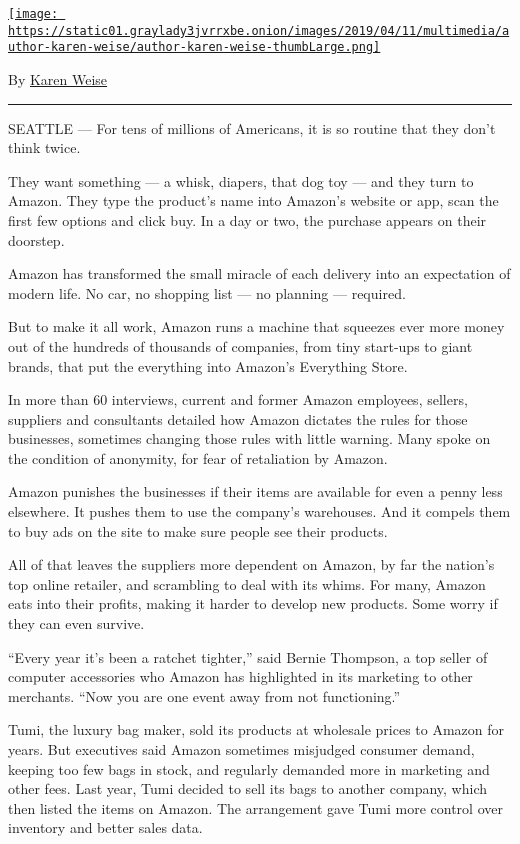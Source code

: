 \href{https://www.nytimes3xbfgragh.onion/by/karen-weise}{\texttt{[image: https://static01.graylady3jvrrxbe.onion/images/2019/04/11/multimedia/author-karen-weise/author-karen-weise-thumbLarge.png]}}

By \href{https://www.nytimes3xbfgragh.onion/by/karen-weise}{Karen Weise}

\begin{center}\rule{0.5\linewidth}{\linethickness}\end{center}

SEATTLE --- For tens of millions of Americans, it is so routine that
they don't think twice.

They want something --- a whisk, diapers, that dog toy --- and they turn
to Amazon. They type the product's name into Amazon's website or app,
scan the first few options and click buy. In a day or two, the purchase
appears on their doorstep.

Amazon has transformed the small miracle of each delivery into an
expectation of modern life. No car, no shopping list --- no planning ---
required.

But to make it all work, Amazon runs a machine that squeezes ever more
money out of the hundreds of thousands of companies, from tiny start-ups
to giant brands, that put the everything into Amazon's Everything Store.

In more than 60 interviews, current and former Amazon employees,
sellers, suppliers and consultants detailed how Amazon dictates the
rules for those businesses, sometimes changing those rules with little
warning. Many spoke on the condition of anonymity, for fear of
retaliation by Amazon.

Amazon punishes the businesses if their items are available for even a
penny less elsewhere. It pushes them to use the company's warehouses.
And it compels them to buy ads on the site to make sure people see their
products.

All of that leaves the suppliers more dependent on Amazon, by far the
nation's top online retailer, and scrambling to deal with its whims. For
many, Amazon eats into their profits, making it harder to develop new
products. Some worry if they can even survive.

``Every year it's been a ratchet tighter,'' said Bernie Thompson, a top
seller of computer accessories who Amazon has highlighted in its
marketing to other merchants. ``Now you are one event away from not
functioning.''

Tumi, the luxury bag maker, sold its products at wholesale prices to
Amazon for years. But executives said Amazon sometimes misjudged
consumer demand, keeping too few bags in stock, and regularly demanded
more in marketing and other fees. Last year, Tumi decided to sell its
bags to another company, which then listed the items on Amazon. The
arrangement gave Tumi more control over inventory and better sales data.

